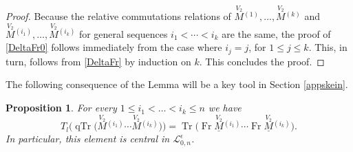 \documentclass[pdftex]{sigma}%
\numberwithin{equation}{section}
\numberwithin{figure}{section}
\newtheorem{prop}[teo]{Proposition}
\newcommand{\e}{\epsilon}
\newcommand{\Ll}{{\mathcal L}}
\begin{document}
\begin{proof}
Because the relative commutations relations of ${\stackrel{V_2}{M}}{}^{(1)},\dots, {\stackrel{V_2}{M}}{}^{(k)}$ and ${\stackrel{V_2}{M}}{}^{(i_1)},\dots ,{\stackrel{V_2}{M}}{}^{(i_k)}$ for general sequences $i_1< \cdots<i_k$ are the same, the proof of \eqref{DeltaFr0} follows immediately from the case where $i_j=j$, for $1\leq j\leq k$. This, in turn, follows from \eqref{DeltaFr} by induction on $k$. This concludes the proof.
\end{proof}

The following consequence of the Lemma will be a key tool in Section \ref{appskein}.
\begin{prop}\label{Thcentral} For every $1\leq i_1< \dots < i_k\leq n$ we have
\[
T_l\big(\!\operatorname{qTr}\big(\!\stackrel{V_2}{M}{}^{\!\! (i_1)}\cdots \stackrel{V_2}{M}{}^{\!\! (i_k)}\big)\big)=\operatorname{Tr}\big(\!\operatorname{Fr}\underline{\stackrel{V_2}{M}}{}^{(i_1)}\cdots \operatorname{Fr}\underline{\stackrel{V_2}{M}}{}^{(i_k)}\big).
\]
In particular, this element is central in $\Ll_{0,n}^\e$.
\end{prop}
\end{document}
